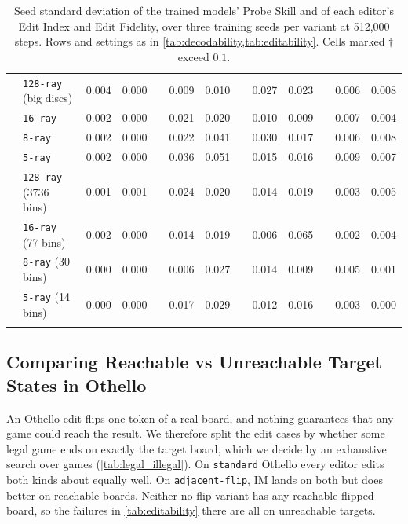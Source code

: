 \documentclass{article} %
\begin{document}
\begin{table}[ht]
\begin{tabular}{ll rr G rr G rr G rr}
& \texttt{128-ray} (big discs) & 0.004 & 0.000 & & 0.009 & 0.010 & & 0.027 & 0.023 & & 0.006 & 0.008 \\
& \texttt{16-ray}   & 0.002 & 0.000 & & 0.021 & 0.020 & & 0.010 & 0.009 & & 0.007 & 0.004 \\
& \texttt{8-ray}    & 0.002 & 0.000 & & 0.022 & 0.041 & & 0.030 & 0.017 & & 0.006 & 0.008 \\
& \texttt{5-ray}    & 0.002 & 0.000 & & 0.036 & 0.051 & & 0.015 & 0.016 & & 0.009 & 0.007 \\
\noalign{\vspace{0.1em}}
& \texttt{128-ray} (3736 bins) & 0.001 & 0.001 & & 0.024 & 0.020 & & 0.014 & 0.019 & & 0.003 & 0.005 \\
& \texttt{16-ray} (77 bins)    & 0.002 & 0.000 & & 0.014 & 0.019 & & 0.006 & 0.065 & & 0.002 & 0.004 \\
& \texttt{8-ray} (30 bins)     & 0.000 & 0.000 & & 0.006 & 0.027 & & 0.014 & 0.009 & & 0.005 & 0.001 \\
& \texttt{5-ray} (14 bins)     & 0.000 & 0.000 & & 0.017 & 0.029 & & 0.012 & 0.016 & & 0.003 & 0.000 \\
\noalign{\vspace{0.75em}}
\hline
\end{tabular}
\caption{Seed standard deviation of the trained models' Probe Skill and of each editor's Edit Index and Edit Fidelity, over three training seeds per variant at 512,000 steps. Rows and settings as in \cref{tab:decodability,tab:editability}. Cells marked $\dagger$ exceed $0.1$.}
\label{tab:seed_spread}
\end{table}


\FloatBarrier
\subsection{Comparing Reachable vs Unreachable Target States in Othello}
\label{app:legal_vs_illegal_othello}

An Othello edit flips one token of a real board, and nothing guarantees that any game could reach the result. We therefore split the edit cases by whether some legal game ends on exactly the target board, which we decide by an exhaustive search over games (\cref{tab:legal_illegal}). On \texttt{standard} Othello every editor edits both kinds about equally well. On \texttt{adjacent-flip}, IM lands on both but does better on reachable boards. Neither no-flip variant has any reachable flipped board, so the failures in \cref{tab:editability} there are all on unreachable targets.
\end{document}
